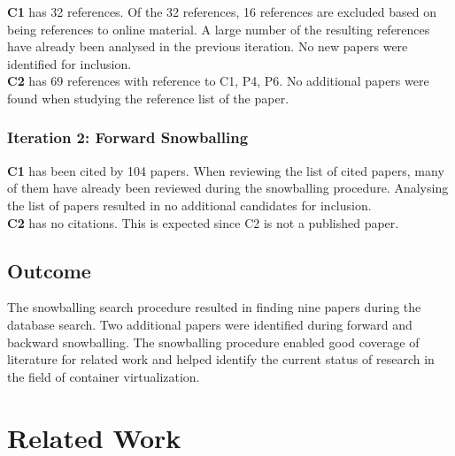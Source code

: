 \textbf{C1} has 32 references. Of the 32 references, 16 references are excluded based on being references to online material. A large number of the resulting references have already been analysed in the previous iteration. No new papers were identified for inclusion.\\ 

\textbf{C2} has 69 references with reference to C1, P4, P6. No additional papers were found when studying the reference list of the paper.

\subsubsection*{Iteration 2: Forward Snowballing}
\textbf{C1} has been cited by 104 papers. When reviewing the list of cited papers, many of them have already been reviewed during the snowballing procedure.  Analysing the list of papers resulted in no additional candidates for inclusion.\\ 
 
\textbf{C2} has no citations. This is expected since C2 is not a published paper. 


\subsection{Outcome}
The snowballing search procedure resulted in finding nine papers during the database search. Two additional papers were identified during forward and backward snowballing. The snowballing procedure enabled good coverage of literature for related work and helped identify the current status of research in the field of container virtualization. 


\section{Related Work} 

